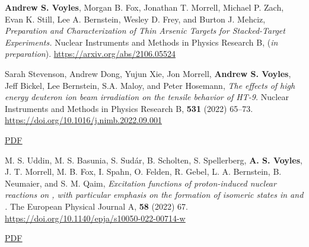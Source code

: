 \begin{bibsection}
\item \textbf{Andrew S. Voyles}, Morgan B. Fox, Jonathan T. Morrell, Michael P. Zach, Evan K. Still, Lee A. Bernstein, Wesley D. Frey, and Burton J. Mehciz, \emph{Preparation and Characterization of Thin Arsenic Targets for Stacked-Target Experiments.} Nuclear Instruments and Methods in Physics Research  B,  (\emph{in preparation}). \url{https://arxiv.org/abs/2106.05524} 










\item Sarah Stevenson, Andrew Dong, Yujun Xie, Jon Morrell, \textbf{Andrew S. Voyles}, Jeff Bickel, Lee Bernstein, S.A. Maloy, and Peter Hosemann, \emph{The effects of high energy deuteron ion beam irradiation on the tensile behavior of HT-9.} Nuclear Instruments and Methods in Physics Research  B, \textbf{531} (2022) 65--73. \url{https://doi.org/10.1016/j.nimb.2022.09.001} 

\ifshort \vspace{0.1cm} \href{https://avoyles.github.io/papers/Stevenson2022_dogbones.pdf}{\underline{PDF}} \else  \fi 

\item M. S. Uddin, M. S. Basunia, S. Sudár, B. Scholten, S. Spellerberg, \textbf{A. S. Voyles}, J. T. Morrell, M. B. Fox, I. Spahn, O. Felden, R. Gebel, L. A. Bernstein, B. Neumaier, and S. M. Qaim, \emph{Excitation functions of proton-induced nuclear reactions on , with particular emphasis on the formation of isomeric states in  and .} The European Physical Journal A, \textbf{58} (2022) 67. \url{https://doi.org/10.1140/epja/s10050-022-00714-w}

\ifshort \vspace{0.1cm} \href{https://avoyles.github.io/papers/Uddin2022_86Sr.pdf}{\underline{PDF}} \else  \fi


\end{bibsection}
